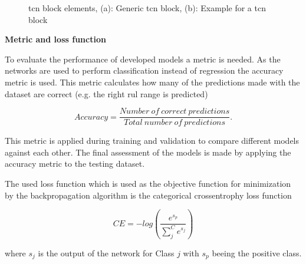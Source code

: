\documentclass[conference]{IEEEtran}
\begin{document}
\begin{figure}[htp]
	\centering
	\qquad
	\caption{\gls{tcn} block elements, (a): Generic \gls{tcn} block, (b): Example for a \gls{tcn} block \cite{Bai2018}}
	\label{fig:tcn_block}
\end{figure}


\noindent
\textbf{Metric and loss function}

To evaluate the performance of developed models a metric is needed. As the networks are used to perform classification instead of regression the accuracy metric is used. This metric calculates how many of the predictions made with the dataset are correct (e.g. the right \gls{rul} range is predicted)

\begin{equation}
	\label{eq:categorical-cross-entrophy}
	Accuracy = \frac{Number \: of \: correct \: predictions}{Total \: number \: of \: predictions}.
\end{equation}

This metric is applied during training and validation to compare different models against each other. The final assessment of the models is made by applying the accuracy metric to the testing dataset.

The used loss function which is used as the objective function for minimization by the backpropagation algorithm is the categorical crossentrophy loss function

\begin{equation}
	\label{eq:categorical-cross-entrophy}
	CE = -log(\frac{e^{s_p}}{\sum_{j}^{C} e^{s_j}})	
\end{equation}

where $ s_j $ is the output of the network for Class $ j $ with $ s_p $ beeing the positive class.
\end{document}
